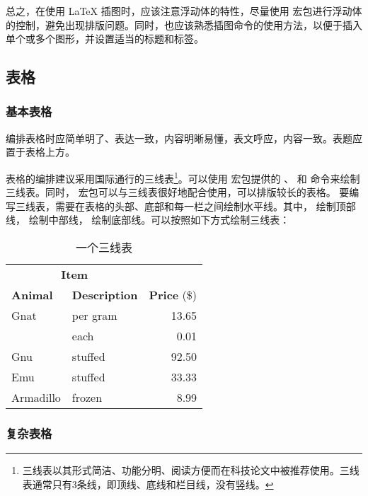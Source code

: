 总之，在使用 \LaTeX{} 插图时，应该注意浮动体的特性，尽量使用  宏包进行浮动体的控制，避免出现排版问题。同时，也应该熟悉插图命令的使用方法，以便于插入单个或多个图形，并设置适当的标题和标签。


\subsection{表格}

\subsubsection{基本表格}

编排表格时应简单明了、表达一致，内容明晰易懂，表文呼应，内容一致。表题应置于表格上方。

表格的编排建议采用国际通行的三线表\footnote{三线表以其形式简洁、功能分明、阅读方便而在科技论文中被推荐使用。三线表通常只有3条线，即顶线、底线和栏目线，没有竖线。}。可以使用  宏包提供的 、 和  命令来绘制三线表。同时， 宏包可以与三线表很好地配合使用，可以排版较长的表格。
要编写三线表，需要在表格的头部、底部和每一栏之间绘制水平线。其中， 绘制顶部线， 绘制中部线， 绘制底部线。可以按照如下方式绘制三线表：

\begin{table}[!hpt]
  \caption{一个三线表}
  \label{tab:firstone}
  \centering
  \begin{tabular}{@{}llr@{}} \toprule
    \multicolumn{2}{c}{\textbf{Item}}                            \\ \cmidrule(r){1-2}
    \textbf{Animal} & \textbf{Description} & \textbf{Price} (\$) \\ \midrule
    Gnat            & per gram             & 13.65               \\
                    & each                 & 0.01                \\
    Gnu             & stuffed              & 92.50               \\
    Emu             & stuffed              & 33.33               \\
    Armadillo       & frozen               & 8.99                \\ \bottomrule
  \end{tabular}
\end{table}

\subsubsection{复杂表格}

